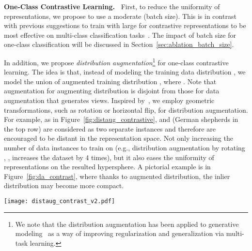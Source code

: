 \documentclass{article} \usepackage{iclr2021_conference,times}
\begin{document}
\textbf{One-Class Contrastive Learning.~}
First, to reduce the uniformity of representations, we propose to use a moderate  (batch size). This is in contrast with previous suggestions to train with large  for contrastive representations to be most effective on multi-class classification tasks~\citep{henaff2019data,bachman2019learning,chen2020simple}. The impact of batch size  for one-class classification will be discussed in Section~\ref{sec:ablation_batch_size}. 


In addition, we propose \emph{distribution augmentation}\footnote{We note that the distribution augmentation has been applied to generative modeling~\citep{icml2020_6095} as a way of improving regularization and generalization via multi-task learning.} for one-class contrastive learning.
The idea is that, instead of modeling the training data distribution , we model the union of augmented training distribution , where . 
Note that augmentation  for augmenting distribution is disjoint from those for data augmentation  that generates views. Inspired by~\citet{golan2018deep}, we employ geometric transformations, such as rotation or horizontal flip, for distribution augmentation. 
For example, as in Figure~\ref{fig:distaug_contrastive},  and  (German shepherds in the top row) are considered as two separate instances and therefore are encouraged to be distant in the representation space. Not only increasing the number of data instances to train on (e.g., distribution augmentation by rotating , ,  increases the dataset by 4 times), but it also eases the uniformity of representations on the resulted hypersphere. A pictorial example is in Figure~\ref{fig:da_contrast}, where thanks to augmented distribution, the inlier distribution may become more compact. 









\begin{SCfigure}[][t]
    \centering
    \texttt{[image: distaug\_contrast\_v2.pdf]}
    \caption{Distribution-augmented contrastive learning. Not only learning to discriminate different instances from an original distribution (e.g., two images of different dogs on the left), it also learns to discriminate instances from different distributions created via augmentations, such as rotations (e.g., two images of the same dog with different rotation degrees on the top).}
    \label{fig:distaug_contrastive}
\end{SCfigure}
\end{document}
